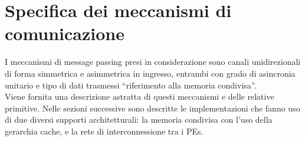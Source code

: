 \FloatBarrier
\section{Specifica dei meccanismi di comunicazione}
\label{sct:specifica_meccanismi}

I meccanismi di message passing presi in considerazione sono canali unidirezio\-nali di forma simmetrica e asimmetrica in ingresso, entrambi con grado di asincronia unitario e tipo di dati trasmessi ``riferimento alla memoria condivisa''. \\
Viene fornita una descrizione astratta di questi meccanismi e delle relative primitive. Nelle sezioni successive sono descritte le implementazioni che fanno uso di due diversi supporti architetturali: la memoria condivisa con l'uso della gerarchia cache, e la rete di interconnessione tra i PEs. 


\newpage

\newpage

\newpage


